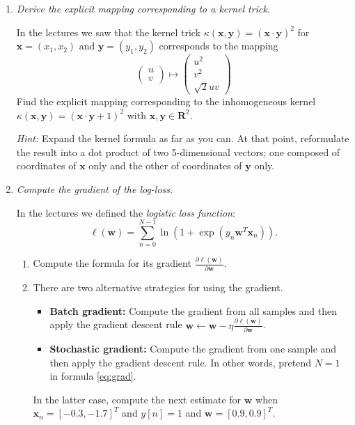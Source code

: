 \documentclass[a4paper,12pt]{scrartcl}
\newcommand{\x}{\mathbf{ x}}
\newcommand{\y}{\mathbf{ y}}
\newcommand{\w}{\mathbf{ w}}
\newcommand{\R}{\mathbf{ R}}
\newcommand{\pen}{{\fbox{\texttt{\bfseries pen\&paper}}\quad}}
\begin{document}
\begin{enumerate}

\item \pen \emph{Derive the explicit mapping corresponding to a kernel trick.}

In the lectures we saw that the kernel trick $\kappa(\x, \y) = (\x \cdot \y)^2$
for $\x = (x_1,x_2)$ and $\y = (y_1,y_2)$ corresponds to the mapping 
\[
\begin{pmatrix}
u \\ v
\end{pmatrix}
\mapsto 
\begin{pmatrix}
u^2\\
v^2\\
\sqrt{2}u v
\end{pmatrix}
\]
Find the explicit mapping corresponding to the inhomogeneous kernel
$\kappa(\x, \y) = (\x \cdot \y + 1)^2$ with $\x, \y\in\R^2$.

\emph{Hint:} Expand the kernel formula as far as you can. 
At that point, reformulate the result into a dot product of
two 5-dimensional vectors; one composed of coordinates of $\x$ only
and the other of coordinates of $\y$ only.

\item \pen \emph{Compute the gradient of the log-loss.}

In the lectures we defined the \emph{logistic loss function}:
\begin{equation}
\ell(\w) = \sum_{n = 0}^{N-1} \ln(1 + \exp(y_n\w^T\x_n)).
\label{eq:grad}
\end{equation}

\begin{enumerate}
	\item Compute the formula for its gradient $\frac{\partial \ell(\w) }{\partial \w}$.
	\item There are two alternative strategies for using the gradient.
	\begin{itemize}
		\item \textbf{Batch gradient:} Compute the gradient from all samples and then apply the gradient descent rule
		$\w \leftarrow \w - \eta \frac{\partial \ell(\w) }{\partial \w}$.
		\item \textbf{Stochastic gradient:} Compute the gradient from one sample and then apply the gradient descent rule.
		In other words, pretend $N = 1$ in formula \ref{eq:grad}.
	\end{itemize}
	In the latter case, compute the next estimate for $\w$ when $\x_n = [-0.3, -1.7]^T$ and
	$y[n] = 1$ and $\w =[  0.9,  0.9]^T$.
\end{enumerate}


\end{enumerate}
\end{document}
